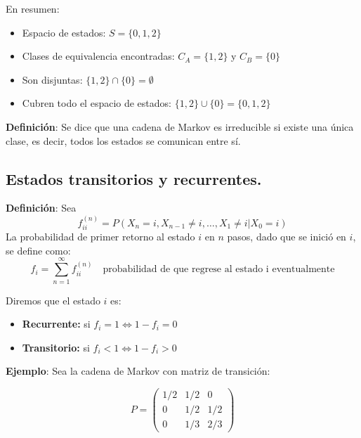 \documentclass[12pt,a4paper]{article}
\newcommand{\definicion}[1]{%
\begin{definicionbox}
\textbf{Definición}: #1
\end{definicionbox}
}
\begin{document}
En resumen:

\begin{itemize}
    \item Espacio de estados: $S = \{0, 1, 2\}$
    \item Clases de equivalencia encontradas: $C_A = \{1, 2\}$ y $C_B = \{0\}$
    \item Son disjuntas: $\{1, 2\} \cap \{0\} = \emptyset$
    \item Cubren todo el espacio de estados: $\{1, 2\} \cup \{0\} = \{0, 1, 2\}$
\end{itemize}

\definicion{Se dice que una cadena de Markov es irreducible si existe una única clase, es decir, todos los estados se comunican entre sí.}

\subsection*{Estados transitorios y recurrentes.}

\definicion{Sea
\begin{equation*}
f_{ii}^{(n)} = P(X_n=i, X_{n-1} \neq i, \dots, X_1 \neq i | X_0=i)
\end{equation*}
La probabilidad de primer retorno al estado $i$ en $n$ pasos, dado que se inició en $i$, se define como:
\begin{equation*}
f_i = \sum_{n=1}^{\infty} f_{ii}^{(n)} \quad \text{probabilidad de que regrese al estado i eventualmente}
\end{equation*}

Diremos que el estado $i$ es:
\begin{itemize}
    \item \textbf{Recurrente:} si $f_i = 1 \iff 1 - f_i = 0$
    \item \textbf{Transitorio:} si $f_i < 1 \iff 1 - f_i > 0$
\end{itemize}}

\textbf{Ejemplo}: Sea la cadena de Markov con matriz de transición:

\begin{equation*}
P = \begin{pmatrix}
1/2 & 1/2 & 0 \\
0 & 1/2 & 1/2 \\
0 & 1/3 & 2/3
\end{pmatrix}
\end{equation*}

\begin{center}
\end{center}
\end{document}
